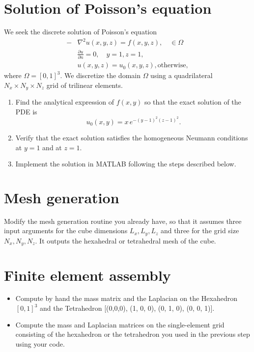 \documentclass[unicode,11pt,a4paper,oneside,numbers=endperiod,openany]{scrartcl}
\begin{document}
\setassignment
{}

\section*{Solution of Poisson's equation}
We seek the discrete solution of Poisson's equation
\begin{align*}
-&\nabla^2 u(x, y, z) = f(x,y, z), \quad \in \Omega \\
&\frac{\partial{u}}{\partial n}       = 0, \quad y=1, z=1,\\
&u(x, y, z) = u_0(x, y, z), \text{otherwise},
\end{align*}
where $\Omega = [0,1]^3$. We discretize the domain $\Omega$ using a quadrilateral $N_x \times N_y \times N_z$ grid of trilinear elements. 
\begin{enumerate}
\item Find the analytical expression of $f(x,y)$ so that the exact 
solution of the PDE is \[u_0(x,y) =x\, e^{-(y-1)^2 (z-1)^2}.\] 
\item Verify that the exact solution satisfies the homogeneous Neumann conditions
at $y=1$ and at $z=1$. 
\item Implement the solution in \small{MATLAB} following the steps described below.
\end{enumerate}


\section{Mesh generation}
Modify the mesh generation routine you already have,
so that it assumes three input arguments for the cube dimensions $L_x,L_y,L_z$ and 
three for the grid size $N_x,N_y,N_z$. It outputs the hexahedral or tetrahedral mesh of the cube.


\section{Finite element assembly}
\begin{itemize}
\item Compute by hand the mass matrix and the Laplacian on the Hexahedron $[0, 1]^3$ and
the Tetrahedron [(0,0,0), (1, 0, 0), (0, 1, 0), (0, 0, 1)].
\item Compute the mass and Laplacian matrices on the single-element grid consisting
of the hexahedron or the tetrahedron you used in the previous step using your code. 
\end{itemize}
\end{document}
